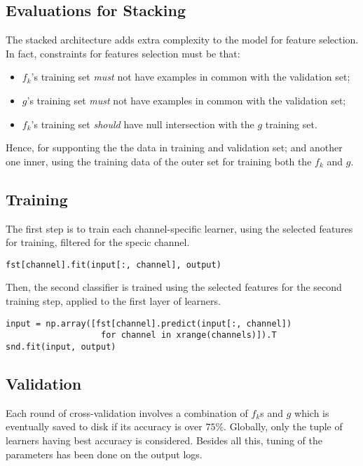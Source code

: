 \documentclass[10pt]{article}
\begin{document}
\subsection{Evaluations for Stacking}

The stacked architecture adds extra complexity to the model for feature selection. In fact, constraints for features selection must be that: 
\begin{itemize}
\item $f_k$'s training set \emph{must} not have examples in common with the validation set;
\item $g$'s training set \emph{must} not have examples in common with the validation set;
\item $f_k$'s training set \emph{should} have null intersection with the $g$ training set.
\end{itemize}

Hence, for supponting the the data in training and validation set; and another one inner, using the training data of the outer set for training both the $f_k$ and $g$. 

\subsection{Training}

The first step is to train each channel-specific learner, using the selected features for training, filtered for the specic channel. 
\begin{verbatim}
fst[channel].fit(input[:, channel], output)
\end{verbatim}

\noindent
Then, the second classifier is trained using the selected features for the second training step, applied to the first layer of learners.
\begin{verbatim}
input = np.array([fst[channel].predict(input[:, channel])
                   for channel in xrange(channels)]).T
snd.fit(input, output)

\end{verbatim}


\subsection{Validation}
Each round of cross-validation involves a combination of $f_k$s and $g$ which is eventually saved to disk if its accuracy is over $75\%$. 
Globally, only the tuple of learners having best accuracy is considered.
Besides all this, tuning of the parameters has been done on the output logs.
\end{document}
